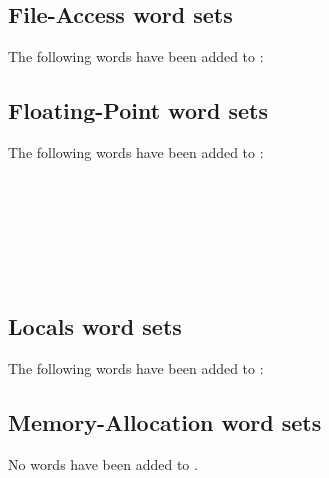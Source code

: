 \subsection{File-Access word sets}
The following words have been added to :

\begin{minipage}[t]{0.3\linewidth}
\end{minipage}
\hfill
\begin{minipage}[t]{0.3\linewidth}
\end{minipage}
\hfill
\begin{minipage}[t]{0.3\linewidth}
\end{minipage}

\subsection{Floating-Point word sets}
The following words have been added to :

\begin{minipage}[t]{0.3\linewidth}
	 \\
	 \\
\end{minipage}
\hfill
\begin{minipage}[t]{0.3\linewidth}
	 \\
\end{minipage}
\hfill
\begin{minipage}[t]{0.3\linewidth}
	 \\
\end{minipage}

\subsection{Locals word sets}
The following words have been added to :


\subsection{Memory-Allocation word sets}
No words have been added to .

